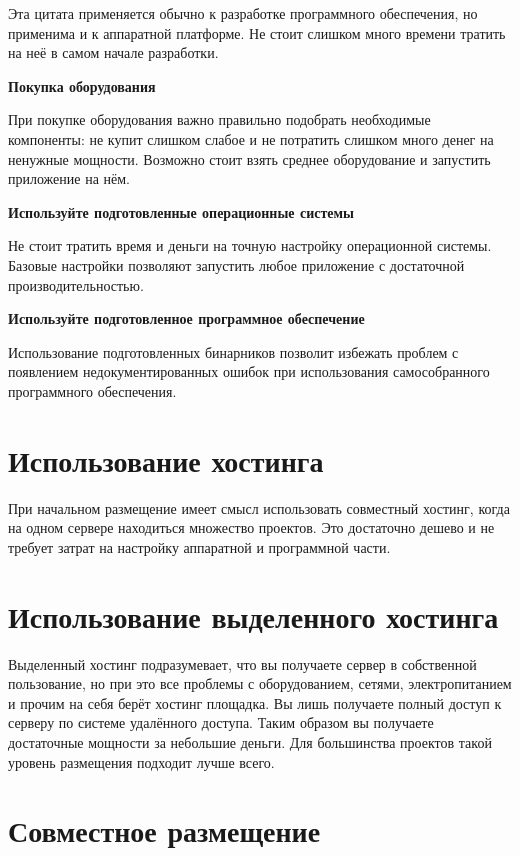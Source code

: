 Эта цитата применяется обычно к разработке программного обеспечения, но применима и к аппаратной платформе. Не стоит слишком много времени тратить на неё в самом начале разработки.

\textbf{Покупка оборудования}

При покупке оборудования важно правильно подобрать необходимые компоненты: не купит слишком слабое и не потратить слишком много денег на ненужные мощности. Возможно стоит взять среднее оборудование и запустить приложение на нём.


\textbf{Используйте подготовленные операционные системы}

Не стоит тратить время и деньги на точную настройку операционной системы. Базовые настройки позволяют запустить любое приложение с достаточной производительностью.

\textbf{Используйте подготовленное программное обеспечение}

Использование подготовленных бинарников позволит избежать проблем с появлением недокументированных ошибок при использования самособранного программного обеспечения.



\section{ Использование хостинга } \label{sect2_7}

При начальном размещение имеет смысл использовать совместный хостинг, когда на одном сервере находиться множество проектов. Это достаточно дешево и не требует затрат на настройку аппаратной и программной части.


\section{ Использование выделенного хостинга } \label{sect2_8}

Выделенный хостинг подразумевает, что вы получаете сервер в собственной пользование, но при это все проблемы с оборудованием, сетями, электропитанием и прочим на себя берёт хостинг площадка. Вы лишь получаете полный доступ к серверу по системе удалённого доступа. Таким образом вы получаете достаточные мощности за небольшие деньги. Для большинства проектов такой уровень размещения подходит лучше всего.

\section{ Совместное размещение } \label{sect2_9}

